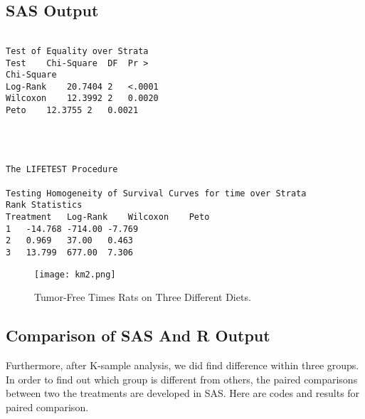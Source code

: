 \documentclass[11pt]{article}
\numberwithin{figure}{section}
\begin{document}
\subsection{SAS Output}

\begin{verbatim}
 
Test of Equality over Strata
Test	Chi-Square	DF	Pr >
Chi-Square
Log-Rank	20.7404	2	<.0001
Wilcoxon	12.3992	2	0.0020
Peto	12.3755	2	0.0021




The LIFETEST Procedure

Testing Homogeneity of Survival Curves for time over Strata
Rank Statistics
Treatment	Log-Rank	Wilcoxon	Peto
1	-14.768	-714.00	-7.769
2	0.969	37.00	0.463
3	13.799	677.00	7.306

\end{verbatim}



\begin{figure}[h!]
  \caption{Tumor-Free Times Rats on Three Different Diets.}
  \centering
    \texttt{[image: km2.png]}
\label{fig:awesome_image}
\end{figure}

\newpage
\subsection{Comparison of SAS And R Output}
\begin{center}
\end{center}

\hspace{5mm}
Furthermore, after K-sample analysis, we did find difference within three groups. In order to find out which group is different from others, the paired comparisons between two the treatments are developed in SAS. Here are codes and results for paired comparison. 



\newpage
\end{document}
